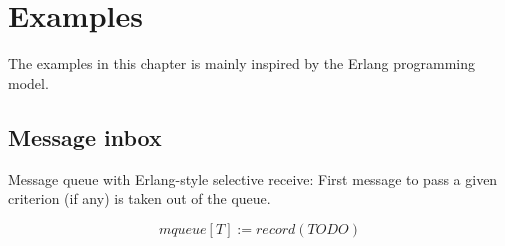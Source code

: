 \documentclass[a4paper]{book}
\begin{document}
\chapter{Examples}

The examples in this chapter is mainly inspired by the Erlang
programming model.

\section{Message inbox}

Message queue with Erlang-style selective receive: First message to
pass a given criterion (if any) is taken out of the queue.

%
%

$$
mqueue[T] := record(TODO)
$$
\end{document}
